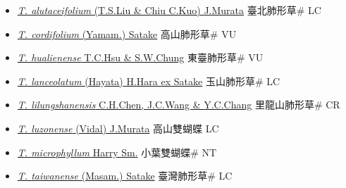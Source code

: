 \begin{itemize}
  \begin{itemize}
        \item[] \href{http://www.theplantlist.org/tpl1.1/search?q=Tripterospermum+alutaceifolium}{\textit{T. alutaceifolium} (T.S.Liu \& Chiu C.Kuo) J.Murata}   臺北肺形草\# LC
        \item[] \href{http://www.theplantlist.org/tpl1.1/search?q=Tripterospermum+cordifolium}{\textit{T. cordifolium} (Yamam.) Satake}   高山肺形草\# VU
        \item[] \href{http://www.theplantlist.org/tpl1.1/search?q=Tripterospermum+hualienense}{\textit{T. hualienense} T.C.Hsu \& S.W.Chung}   東臺肺形草\# VU
        \item[] \href{http://www.theplantlist.org/tpl1.1/search?q=Tripterospermum+lanceolatum}{\textit{T. lanceolatum} (Hayata) H.Hara ex Satake}   玉山肺形草\# LC
        \item[] \href{http://www.theplantlist.org/tpl1.1/search?q=Tripterospermum+lilungshanensis}{\textit{T. lilungshanensis} C.H.Chen, J.C.Wang \& Y.C.Chang}   里龍山肺形草\# CR
        \item[] \href{http://www.theplantlist.org/tpl1.1/search?q=Tripterospermum+luzonense}{\textit{T. luzonense} (Vidal) J.Murata}   高山雙蝴蝶 LC
        \item[] \href{http://www.theplantlist.org/tpl1.1/search?q=Tripterospermum+microphyllum}{\textit{T. microphyllum} Harry Sm.}   小葉雙蝴蝶\# NT
        \item[] \href{http://www.theplantlist.org/tpl1.1/search?q=Tripterospermum+taiwanense}{\textit{T. taiwanense} (Masam.) Satake}   臺灣肺形草\# LC
  \end{itemize}
  \end{itemize}
